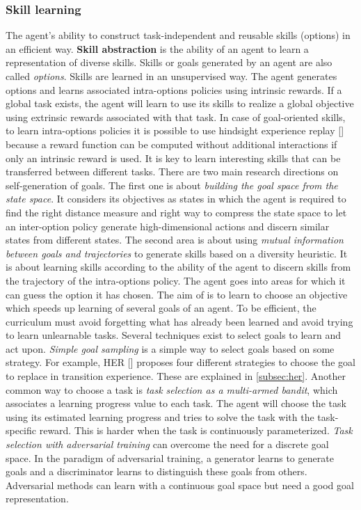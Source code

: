 \documentclass[conference]{IEEEtran}
\begin{document}
\subsubsection{Skill learning} \label{subsubsec:skill_learning}
The agent's ability to construct task-independent and reusable skills (options) in an efficient way. \textbf{Skill abstraction} is the ability of an agent to learn a representation of diverse skills. Skills or goals generated by an agent are also called \textit{options}. Skills are learned in an unsupervised way. The agent generates options and learns associated intra-options policies using intrinsic rewards. If a global task exists, the agent will learn to use its skills to realize a global objective using extrinsic rewards associated with that task. In case of goal-oriented skills, to learn intra-options policies it is possible to use hindsight experience replay [\cite{andrychowicz2017hindsight}] because a reward function can be computed without additional interactions if only an intrinsic reward is used. It is key to learn interesting skills that can be transferred between different tasks. There are two main research directions on self-generation of goals. The first one is about \textit{building the goal space from the state space}. It considers its objectives as states in which the agent is required to find the right distance measure and right way to compress the state space to let an inter-option policy generate high-dimensional actions and discern similar states from different states. The second area is about using \textit{mutual information between goals and trajectories} to generate skills based on a diversity heuristic. It is about learning skills according to the ability of the agent to discern skills from the trajectory of the intra-options policy. The agent goes into areas for which it can guess the option it has chosen. The aim of  is to learn to choose an objective which speeds up learning of several goals of an agent. To be efficient, the curriculum must avoid forgetting what has already been learned and avoid trying to learn unlearnable tasks. Several techniques exist to select goals to learn and act upon. \textit{Simple goal sampling} is a simple way to select goals based on some strategy. For example, HER [\cite{andrychowicz2017hindsight}] proposes four different strategies to choose the goal to replace in transition experience. These are explained in \ref{subsec:her}. Another common way to choose a task is \textit{task selection as a multi-armed bandit}, which associates a learning progress value to each task. The agent will choose the task using its estimated learning progress and tries to solve the task with the task-specific reward. This is harder when the task is continuously parameterized. \textit{Task selection with adversarial training} can overcome the need for a discrete goal space. In the paradigm of adversarial training, a generator learns to generate goals and a discriminator learns to distinguish these goals from others. Adversarial methods can learn with a continuous goal space but need a good goal representation.
\end{document}
